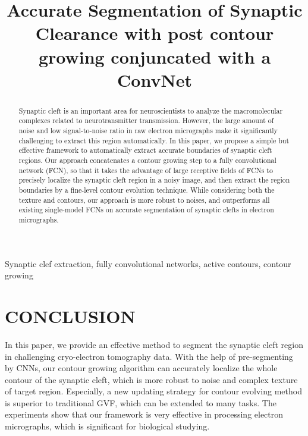 \documentclass{article}
\begin{document}
\sloppy

\def\x{{\mathbf x}}
\def\L{{\cal L}}


\title{Accurate Segmentation of Synaptic Clearance with post contour growing conjuncated with a ConvNet}
%
\address{}


\maketitle


%
\begin{abstract}

Synaptic cleft is an important area for neuroscientists to analyze the macromolecular complexes related to neurotransmitter transmission.
However, the large amount of noise and low signal-to-noise ratio in raw electron micrographs make it significantly challenging to extract this region automatically.
%
In this paper, we propose a simple but effective framework to automatically extract accurate boundaries of synaptic cleft regions.
Our approach concatenates a contour growing step to a fully convolutional network (FCN), so that it takes the advantage of large receptive fields of FCNs to precisely localize the synaptic cleft region in a noisy image, and then extract the region boundaries by a fine-level contour evolution technique.
%
While considering both the texture and contours, our approach is more robust to noises, and outperforms all existing single-model FCNs on accurate segmentation of synaptic clefts in electron micrographs.


\end{abstract}
%
\begin{keywords}
Synaptic clef extraction, fully convolutional networks, active contours, contour growing
\end{keywords}
%

%


\section{CONCLUSION}
\label{sec:conclusion}
In this paper, we provide an effective method to segment the synaptic cleft region in challenging cryo-electron tomography data.
With the help of pre-segmenting by CNNs, our contour growing algorithm can accurately localize the whole contour of the synaptic cleft, which is more robust to noise and complex texture of target region.
Especially, a new updating strategy for contour evolving method is superior to traditional GVF, which can be extended to many tasks.
The experiments show that our framework is very effective in processing electron micrographs, which is significant for biological studying.

%
%


\end{document}
